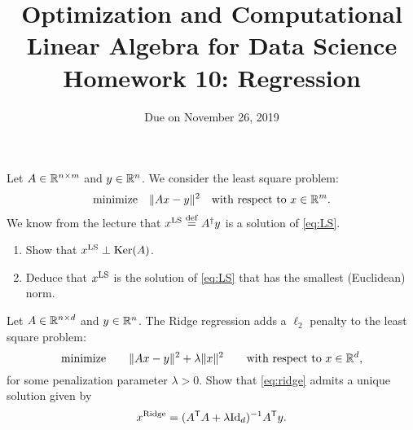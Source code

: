 \documentclass[11pt,nocut]{article}
\title{\vspace{-2.0cm}%
	Optimization and Computational Linear Algebra for Data Science\\
Homework 10: Regression}
\date{\vspace{-1cm}Due on November 26, 2019}
\begin{document}
\maketitle


\vspace{1mm}



\begin{problem}[2 points]
	Let $A \in \mathbb{R}^{n \times m}$ and $y \in \mathbb{R}^n$. We consider the least square problem:
	\begin{equation}\label{eq:LS}
		\text{minimize} \quad \|Ax-y\|^2 \quad \text{with respect to} \ x \in \R^m.
	\end{equation}
	We know from the lecture that $x^{\rm LS} \overset{\rm def}{=} A^{\dagger}y$ is a solution of \eqref{eq:LS}. 
	\begin{enumerate}[label=\normalfont(\textbf{\alph*})]
		\item Show that $x^{\rm LS} \perp {{\rm Ker}}(A)$.
		\item Deduce that $x^{\rm LS}$ is the solution of \eqref{eq:LS} that has the smallest (Euclidean) norm.
	\end{enumerate}
\end{problem}

\vspace{4mm}

\begin{problem}[2 points]
	Let $A \in \mathbb{R}^{n \times d}$ and $y \in \mathbb{R}^n$.
	The Ridge regression adds a $\ell_2$ penalty to the least square problem:
	\begin{equation}\label{eq:ridge}
		\text{minimize} \qquad
		\| Ax - y \|^2 + \lambda \|x\|^2 \qquad \text{with respect to} \ x \in \R^d,
	\end{equation}
	for some penalization parameter $\lambda >0$.
	Show that \eqref{eq:ridge} admits a unique solution given by
	$$
	x^{\rm Ridge} = (A^{{\sf T}} A + \lambda {{\rm Id}}_d)^{-1} A^{{\sf T}} y.
	$$
\end{problem}


\vspace{4mm}
\end{document}
